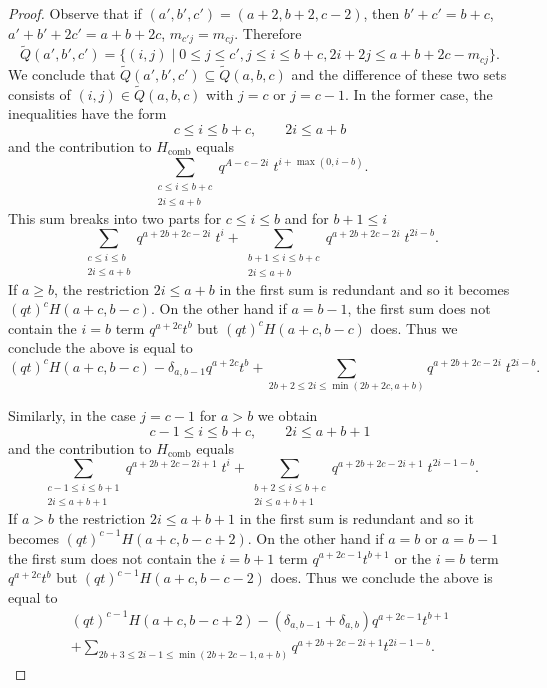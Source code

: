 \documentclass[11pt,reqno]{amsart}
\newcommand{\comb}{\operatorname{comb}}
\theoremstyle{definition}
\numberwithin{equation}{section}
\begin{document}
\begin{proof}
Observe that if $(a',b',c')=(a+2,b+2,c-2)$, then 
$b'+c'=b+c$, $a'+b'+2c'=a+b+2c$, $m_{c'j}=m_{cj}$.
Therefore
\[
	\widetilde{Q}(a',b',c')=\{(i,j) \mid 0\leqslant j\leqslant c',j\leqslant i\leqslant b+c, 2i+2j\leqslant a+b+2c-m_{cj}\}.
\]
We conclude that $\widetilde{Q}(a',b',c')\subseteq \widetilde{Q}(a,b,c)$
and the difference of these two sets consists of 
$(i,j)\in \widetilde{Q}(a,b,c)$ with $j=c$ or $j=c-1$.
In the former case, the inequalities have the form
\begin{equation}
\label{eq: j=c}
	c\leqslant i\leqslant b+c, \qquad 2i\leqslant a+b
\end{equation}
and the contribution to $H_{\comb}$ equals 
\[
	\sum_{\substack{c\leqslant i\leqslant b+c\\ 2i\leqslant  a+b}} q^{A-c-2i}\; t^{i+\max(0,i-b)}.
\]
This sum breaks into two parts for $c\leqslant i\leqslant b$ and for $b+1 \leqslant i$
\begin{equation*}
	\sum_{\substack{c\leqslant i\leqslant b\\ 2i\leqslant a+b}} q^{a+2b+2c-2i} \; t^{i} 
	+ \sum_{\substack{b+1\leqslant i\leqslant b+c\\ 2i\leqslant a+b}} q^{a+2b+2c-2i} \; t^{2i-b}.
\end{equation*}
If $a \geqslant b$, the restriction $2i\leqslant a+b$ in the first sum is redundant and so it becomes $(qt)^c H(a+c,b-c)$.  
On the other hand if $a=b-1$, the first sum does not contain the $i=b$ term $q^{a+2c}t^b$ but  $(qt)^c H(a+c,b-c)$ does.  
Thus we conclude the above is equal to 
\begin{equation*}
	(qt)^c H(a+c,b-c)-\delta_{a,b-1}q^{a+2c}t^b + \sum_{2b+2\leqslant 2i\leqslant \min(2b+2c,a+b)} q^{a+2b+2c-2i}\; t^{2i-b}.
\end{equation*}

Similarly, in the case $j=c-1$ for $a>b$ we obtain
\[
	c-1\leqslant i\leqslant b+c, \qquad 2i\leqslant a+b+1
\]
and the contribution to $H_{\comb}$ equals 
\begin{equation*}
	\sum_{\substack{c-1\leqslant i\leqslant b+1\\ 2i\leqslant a+b+1}} q^{a+2b+2c-2i+1}\; t^{i}
	+\sum_{\substack{b+2\leqslant i\leqslant b+c\\ 2i\leqslant a+b+1}}q^{a+2b+2c-2i+1}\; t^{2i-1-b}.
\end{equation*}
If $a > b$ the restriction $2i\leqslant a+b+1$ in the first sum is redundant and so it becomes $(qt)^{c-1} H(a+c,b-c+2)$.  
On the other hand if $a=b$ or $a=b-1$ the first sum does not contain the $i=b+1$ term $q^{a+2c-1}t^{b+1}$ or the $i=b$ 
term $q^{a+2c}t^b$ but  $(qt)^{c-1} H(a+c,b-c-2)$ does.  Thus we conclude the above is equal to 
\begin{multline*}
	(qt)^{c-1}H(a+c,b-c+2)-(\delta_{a,b-1}+\delta_{a,b})q^{a+2c-1}t^{b+1}\\
	+\sum_{2b+3\leqslant 2i-1\leqslant \min(2b+2c-1,a+b)}q^{a+2b+2c-2i+1}t^{2i-1-b}.
\end{multline*}


\end{proof}
\end{document}
